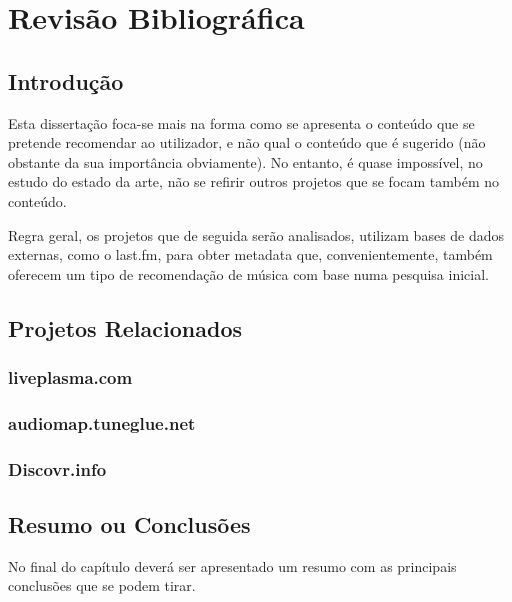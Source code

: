 
\chapter{Revisão Bibliográfica} \label{chap:chap2}

\section*{}

\section{Introdução}

Esta dissertação foca-se mais na forma como se apresenta o conteúdo que se pretende recomendar ao utilizador, e não qual o conteúdo que é sugerido (não obstante da sua importância obviamente).
No entanto, é quase impossível, no estudo do estado da arte, não se refirir outros projetos que se focam também no conteúdo.

Regra geral, os projetos que de seguida serão analisados, utilizam bases de dados externas, como o last.fm, para obter metadata que, convenientemente, também oferecem um tipo de recomendação de música com base numa pesquisa inicial.


\section{Projetos Relacionados} %
\label{sec:projetos_relacionados}


\subsection{liveplasma.com} %
\label{sub:projeto_1}




\subsection{audiomap.tuneglue.net} %
\label{sub:projeto_2}



\subsection{Discovr.info} %
\label{sub:projeto_3}





\section{Resumo ou Conclusões}

No final do capítulo deverá ser apresentado um resumo com as 
principais conclusões que se podem tirar. 
